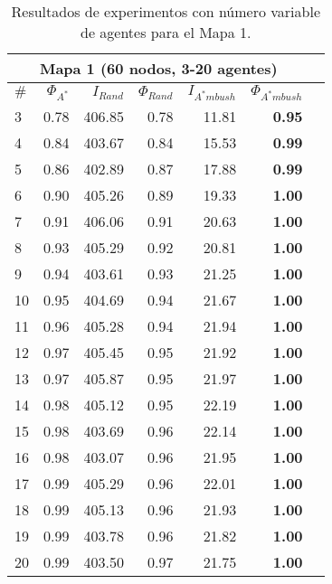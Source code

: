 \begin{table}[htb]
\begin{center}
\begin{tabular}{|l|r|r|r|r|r|r|}
\hline
\multicolumn{6}{|c|}{\textbf{Mapa 1 (60 nodos, 3-20 agentes)}}\\
\hline
$\#$ & $\Phi_{A^*}$ & $I_{Rand}$ & $\Phi_{Rand}$
& $I_{A^*mbush}$ & $\Phi_{A^*mbush}$\\
\hline
 3 & 0.78 & 406.85 & 0.78 & 11.81 & \textbf{0.95}\\
 4 & 0.84 & 403.67 & 0.84 & 15.53 & \textbf{0.99}\\
 5 & 0.86 & 402.89 & 0.87 & 17.88 & \textbf{0.99}\\
 6 & 0.90 & 405.26 & 0.89 & 19.33 & \textbf{1.00}\\
 7 & 0.91 & 406.06 & 0.91 & 20.63 & \textbf{1.00}\\
 8 & 0.93 & 405.29 & 0.92 & 20.81 & \textbf{1.00}\\
 9 & 0.94 & 403.61 & 0.93 & 21.25 & \textbf{1.00}\\
10 & 0.95 & 404.69 & 0.94 & 21.67 & \textbf{1.00}\\
11 & 0.96 & 405.28 & 0.94 & 21.94 & \textbf{1.00}\\
12 & 0.97 & 405.45 & 0.95 & 21.92 & \textbf{1.00}\\
13 & 0.97 & 405.87 & 0.95 & 21.97 & \textbf{1.00}\\
14 & 0.98 & 405.12 & 0.95 & 22.19 & \textbf{1.00}\\
15 & 0.98 & 403.69 & 0.96 & 22.14 & \textbf{1.00}\\
16 & 0.98 & 403.07 & 0.96 & 21.95 & \textbf{1.00}\\
17 & 0.99 & 405.29 & 0.96 & 22.01 & \textbf{1.00}\\
18 & 0.99 & 405.13 & 0.96 & 21.93 & \textbf{1.00}\\
19 & 0.99 & 403.78 & 0.96 & 21.82 & \textbf{1.00}\\
20 & 0.99 & 403.50 & 0.97 & 21.75 & \textbf{1.00}\\
\hline
\end{tabular}
\end{center}
	\caption{\label{tab:g2}
	     Resultados de experimentos con número variable de agentes
	     para el Mapa 1.}
\end{table}